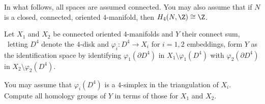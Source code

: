 In what follows, all spaces are assumed connected. You may also assume
that if $N$ is a closed, connected, oriented $4$-manifold, then
$H_4(N,\Z)\cong \Z$.

Let $X_1$ and $X_2$ be connected oriented $4$-manifolds and $Y$ their
connect sum, \ie\ letting $D^4$ denote the $4$-disk and
$\varphi_i:D^4\rightarrow X_i$ for $i=1,2$ embeddings, form $Y$ as the
identification space by identifying 
$\varphi_1(\partial D^4)$ in $X_1
\setminus \varphi_1(D^4)$ with 
$\varphi_2(\partial D^4)$ in $X_2
\setminus \varphi_2(D^4)$.  

You may assume that $\varphi_i(D^4)$ is a $4$-simplex in the
triangulation of $X_i$. Compute all homology groups of $Y$ in terms of
those for $X_1$ and $X_2$.
